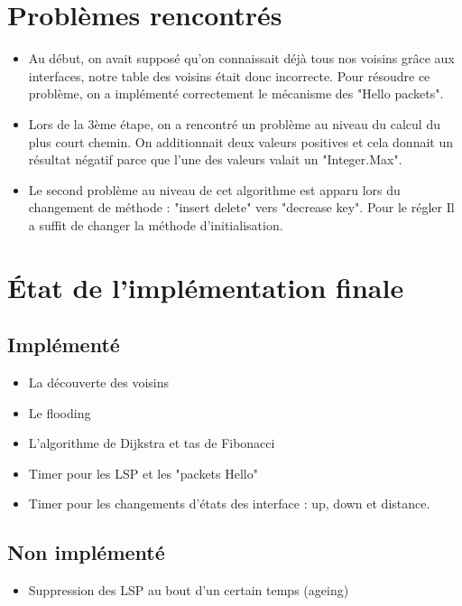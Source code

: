 \documentclass[a4paper, 12pt]{article}
\begin{document}
\section{Problèmes rencontrés}
\begin{itemize}
\item
Au début, on avait supposé qu'on connaissait déjà tous nos voisins grâce aux interfaces, notre table des voisins était donc incorrecte. 
Pour résoudre ce problème, on a implémenté correctement le mécanisme des "Hello packets".
\item
Lors de la 3ème étape, on a rencontré un problème au niveau du calcul du plus court chemin. On additionnait deux valeurs positives et cela donnait un résultat négatif parce que l'une des valeurs valait un "Integer.Max".
\item
Le second problème au niveau de cet algorithme est apparu lors du changement de méthode : "insert delete" vers "decrease key". Pour le régler Il a suffit de changer la méthode d'initialisation.
\end{itemize}
\section{État de l'implémentation finale} 
\subsection{Implémenté}
\begin{itemize}
\item 
La découverte des voisins
\item
Le flooding
\item
L'algorithme de Dijkstra et tas de Fibonacci
\item
Timer pour les LSP et les "packets Hello"
\item Timer pour les changements d'états des interface : up, down et distance.
\end{itemize}
 \subsection{Non implémenté}
\begin{itemize}
\item 
Suppression des LSP au bout d'un certain temps (ageing)
\end{itemize}
\end{document}
